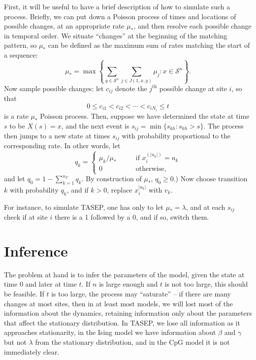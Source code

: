 \documentclass{article}
\newcommand{\calS}{\mathcal{S}}  %
\newcommand{\st}{\colon}  %
\theoremstyle{plain}
\theoremstyle{definition}
\begin{document}
First, it will be useful to have a brief description of how to simulate such a process.
Briefly, we can put down a Poisson process of times and locations of possible changes,
at an appropriate rate $\mu_*$,
and then resolve each possible change in temporal order.
We situate ``changes'' at the beginning of the matching pattern,
so $\mu_*$ can be defined as the maximum sum of rates matching  the start of a sequence:
\[
\mu_* = \max \left\{ \sum_{y \in \calS^n} \sum_{j\in J(1,x,y)} \mu_j \st x \in \calS^n \right\} .
\]
Now sample possible changes: let $c_{ij}$ denote the $j^\text{th}$ possible change at site $i$,
so that
\[
0 \le c_{i1} < c_{i2} < \cdots < c_{iN_i} \le t
\]
is a rate $\mu_*$ Poisson process.
Then, suppose we have determined the state at time $s$ to be $X(s) = x$,
and the next event is $s_{ij} = \min \{ s_{kh} : s_{kh}>s \}$.
The process then jumps to a new state at times $s_{ij}$ with probability proportional to the corresponding rate.
In other words, let
\[
q_k = \begin{cases}
  \mu_k/\mu_* \qquad & \text{if } x_i^{(|u_k|)} = u_k  \\
  0 \qquad & \text{otherwise,}
\end{cases}
\]
and let $q_0 = 1-\sum_{k=1}^{n_T} q_k$.
By construction of $\mu_*$, $q_0\ge 0$.)
Now choose transition $k$ with probability $q_k$, and if $k>0$, replace $x_i^{|u_k|}$ with $v_k$.

For instance, to simulate TASEP, one has only to let $\mu_*=\lambda$, and at each $s_{ij}$
check if at site $i$ there is a 1 followed by a 0,
and if so, switch them.


\section{Inference}

The problem at hand is to infer the parameters of the model, given the state at time 0 and later at time $t$.
If $n$ is large enough and $t$ is not too large,
this should be feasible.
If $t$ is too large, the process may ``saturate'' --
if there are many changes at most sites, then in at least most models,
we will lost most of the information about the dynamics,
retaining information only about the parameters that affect the stationary distribution.
In TASEP, we lose all information as it approaches stationarity,
in the Ising model we have information about $\beta$ and $\gamma$ but not $\lambda$ from the stationary distribution,
and in the CpG model it is not immediately clear.
\end{document}

